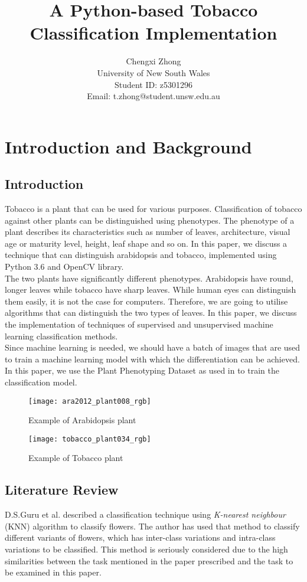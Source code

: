 \documentclass[9pt,technote]{IEEEtran}
\title{A Python-based Tobacco Classification Implementation}
\author{Chengxi Zhong\\ 
University of New South Wales\\ 
Student ID: z5301296\\
Email: t.zhong@student.unsw.edu.au
}
\begin{document}
\maketitle
\section{Introduction and Background}
\subsection{Introduction}
Tobacco is a plant that can be used for various purposes. Classification of tobacco against other plants can be distinguished using phenotypes. The phenotype of a plant describes its characteristics such as number of leaves, architecture, visual age or maturity level, height, leaf shape and so on.\cite{Phenotyp28:online} In this paper, we discuss a technique that can distinguish arabidopsis and tobacco, implemented using Python 3.6 and OpenCV\cite{OpenCV87:online} library.\\

The two plants have significantly different phenotypes. Arabidopsis have round, longer leaves while tobacco have sharp leaves. While human eyes can distinguish them easily, it is not the case for computers. Therefore, we are going to utilise algorithms that can distinguish the two types of leaves. In this paper, we discuss the implementation of techniques of supervised and unsupervised machine learning classification methods.\\

Since machine learning is needed, we should have a batch of images that are used to train a machine learning model with which the differentiation can be achieved. In this paper, we use the Plant Phenotyping Dataset as used in \cite{minervini2016finely} to train the classification model.
\begin{figure}[h!]
  \centering
  \texttt{[image: ara2012\_plant008\_rgb]}
  \caption{Example of Arabidopsis plant}
\end{figure}
\begin{figure}[h!]
  \centering
  \texttt{[image: tobacco\_plant034\_rgb]}
  \caption{Example of Tobacco plant}
\end{figure}
\subsection{Literature Review}
D.S.Guru et al. described a classification technique using \textit{K-nearest neighbour} (KNN) algorithm to classify flowers. \cite{guru2010texture} The author has used that method to classify different variants of flowers, which has inter-class variations and intra-class variations to be classified. This method is seriously considered due to the high similarities between the task mentioned in the paper prescribed and the task to be examined in this paper.


 

\end{document}
